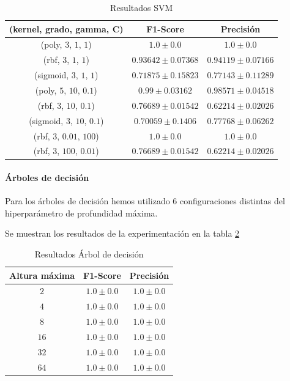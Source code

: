 \documentclass[12pt]{article}
\begin{document}
\begin{table}[ht]
\caption{Resultados SVM}
\centering
	 \begin{tabular}{||c c c||}
		 \hline
		 (kernel, grado, gamma, C) & F1-Score & Precisión  \\ [0.5ex]
		 \hline\hline
		 (poly, $3$, $1$, $1$) & $1.0 \pm 0.0$ & $1.0 \pm 0.0$ \\
		 \hline
		 (rbf, $3$, $1$, $1$) & $0.93642 \pm 0.07368$ & $0.94119 \pm 0.07166$ \\
		 \hline
		 (sigmoid, $3$, $1$, $1$) & $0.71875 \pm 0.15823$ & $0.77143 \pm 0.11289$ \\
		 \hline
		 (poly, $5$, $10$, $0.1$) & $0.99 \pm 0.03162$ & $0.98571 \pm 0.04518$ \\
		 \hline
		 (rbf, $3$, $10$, $0.1$) & $0.76689 \pm 0.01542$ & $0.62214 \pm 0.02026$ \\
		 \hline
		 (sigmoid, $3$, $10$, $0.1$) & $0.70059 \pm 0.1406$ & $0.77768 \pm 0.06262$ \\
		 \hline
		 (rbf, $3$, $0.01$, $100$) & $1.0 \pm 0.0$ & $1.0 \pm 0.0$ \\
		 \hline
		 (rbf, $3$, $100$, $0.01$) & $0.76689 \pm 0.01542$ & $0.62214 \pm 0.02026$ \\
		 \hline
	 \end{tabular}
\label{Tab:SVM}
\end{table}

\paragraph{Árboles de decisión}
Para los árboles de decisión hemos utilizado 6 configuraciones distintas del hiperparámetro de profundidad máxima.

Se muestran los resultados de la experimentación en la tabla \ref{Tab:DecisionTree}

\begin{table}[ht]
	\caption{Resultados Árbol de decisión}
	\centering
		 \begin{tabular}{||c c c||}
			 \hline
			 Altura máxima & F1-Score & Precisión  \\ [0.5ex]
			 \hline\hline
			 $2$ & $1.0 \pm 0.0$ & $1.0 \pm 0.0$ \\
			 \hline
			 $4$ & $1.0 \pm 0.0$ & $1.0 \pm 0.0$ \\
			 \hline
			 $8$ & $1.0 \pm 0.0$ & $1.0 \pm 0.0$ \\
			 \hline
			 $16$ & $1.0 \pm 0.0$ & $1.0 \pm 0.0$ \\
			 \hline
			 $32$ & $1.0 \pm 0.0$ & $1.0 \pm 0.0$ \\
			 \hline
			 $64$ & $1.0 \pm 0.0$ & $1.0 \pm 0.0$ \\
			 \hline
		 \end{tabular}
	\label{Tab:DecisionTree}
\end{table}
\end{document}
